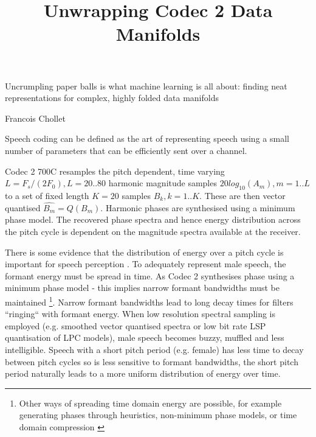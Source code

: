 \documentclass{article}
\begin{document}


\title{Unwrapping Codec 2 Data Manifolds}
\maketitle

\epigraph{Uncrumpling paper balls is what machine learning is all about: finding neat representations for complex, highly folded data manifolds}{Francois Chollet \cite{chollet2018deep}}

Speech coding can be defined as the art of representing speech using a small number of parameters that can be efficiently sent over a channel.

Codec 2 700C resamples the pitch dependent, time varying $L=F_s/(2F_0), L=20..80$ harmonic magnitude samples $20log_{10}(A_m), m=1..L$ to a set of fixed length $K=20$ samples $B_k,k=1..K$.  These are then vector quantised $\hat{B_m}=Q(B_m)$.  Harmonic phases are synthesised using a minimum phase model. The recovered phase spectra and hence energy distribution across the pitch cycle is dependent on the magnitude spectra available at the receiver.

There is some evidence that the distribution of energy over a pitch cycle is important for speech perception \cite{rowe2023_ratek_study}. To adequately represent male speech, the formant energy must be spread in time.  As Codec 2 synthesises phase using a minimum phase model - this implies narrow formant bandwidths must be maintained \footnote{Other ways of spreading time domain energy are possible, for example generating phases through heuristics, non-minimum phase models, or time domain compression \cite{rowe2023_ratek_study}}.  Narrow formant bandwidths lead to long decay times for filters ``ringing`` with formant energy. When low resolution spectral sampling is employed (e.g. smoothed vector quantised spectra or low bit rate LSP quantisation of LPC models), male speech becomes buzzy, muffled and less intelligible.  Speech with a short pitch period (e.g. female) has less time to decay between pitch cycles so is less sensitive to formant bandwidths, the short pitch period naturally leads to a more uniform distribution of energy over time.
\end{document}
